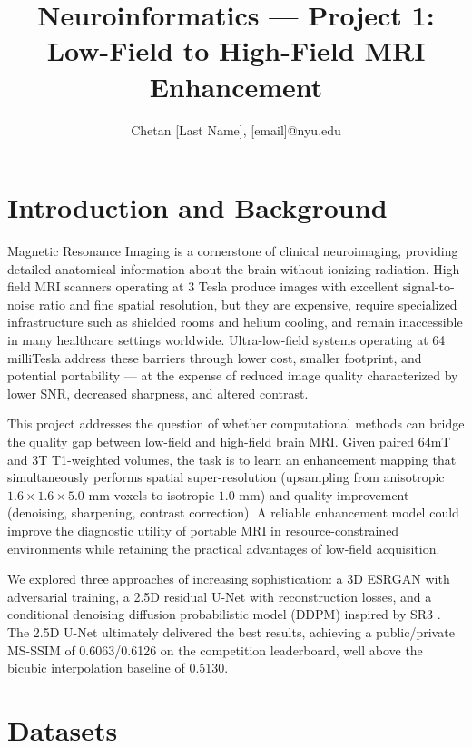 \documentclass[a4paper,11pt]{article}
\makeatletter
\renewcommand{\maketitle}{\bgroup\setlength{\parindent}{0pt}
\begin{flushleft}
  \thispagestyle{plain}
  \textbf{\@title}

  \@author
\end{flushleft}\egroup
}
\makeatother
\begin{document}
\title{\Large Neuroinformatics --- Project 1: Low-Field to High-Field MRI Enhancement
\newline}
\author{Chetan [Last Name], [email]@nyu.edu}

\date{}

\maketitle

\section{Introduction and Background}
Magnetic Resonance Imaging is a cornerstone of clinical neuroimaging, providing detailed anatomical information about the brain without ionizing radiation. High-field MRI scanners operating at 3 Tesla produce images with excellent signal-to-noise ratio and fine spatial resolution, but they are expensive, require specialized infrastructure such as shielded rooms and helium cooling, and remain inaccessible in many healthcare settings worldwide. Ultra-low-field systems operating at 64 milliTesla address these barriers through lower cost, smaller footprint, and potential portability --- at the expense of reduced image quality characterized by lower SNR, decreased sharpness, and altered contrast.

This project addresses the question of whether computational methods can bridge the quality gap between low-field and high-field brain MRI. Given paired 64mT and 3T T1-weighted volumes, the task is to learn an enhancement mapping that simultaneously performs spatial super-resolution (upsampling from anisotropic $1.6 \times 1.6 \times 5.0$ mm voxels to isotropic $1.0$ mm) and quality improvement (denoising, sharpening, contrast correction). A reliable enhancement model could improve the diagnostic utility of portable MRI in resource-constrained environments while retaining the practical advantages of low-field acquisition.

We explored three approaches of increasing sophistication: a 3D ESRGAN with adversarial training, a 2.5D residual U-Net with reconstruction losses, and a conditional denoising diffusion probabilistic model (DDPM) inspired by SR3 \cite{saharia2022image}. The 2.5D U-Net ultimately delivered the best results, achieving a public/private MS-SSIM of 0.6063/0.6126 on the competition leaderboard, well above the bicubic interpolation baseline of 0.5130.

\section{Datasets}
\end{document}
